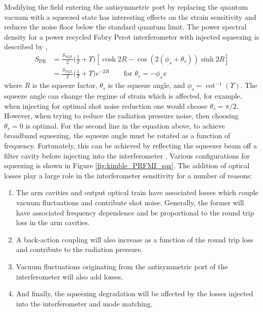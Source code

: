 	Modifying the field entering the antisymmetric port by replacing the quantum vacuum with a squeezed state has interesting effects on the strain sensitivity and reduces the noise floor below the standard quantum limit. The power spectral density for a power recycled Fabry Perot interferometer with injected squeezing is described by \cite{KimbleConversion},
	\begin{equation}
	\begin{aligned}
	S_{\text{PR}} 	&=  \frac{S_{SQL}}{2} \bigg( \frac{1}{\Upsilon}  + \Upsilon\bigg) [\cosh{2R} - \cos(2(\phi_s+\theta_s)) \sinh{2R}]\\
	&= \frac{S_{SQL}}{2} \bigg( \frac{1}{\Upsilon}  + \Upsilon\bigg) e^{-2R} \qquad \text{for } \theta_s = -\phi_s
x	\end{aligned}
	\end{equation}
	where $R$ is the squeeze factor, $\theta_s$ is the squeeze angle, and $\phi_s = \cot^{-1}(\Upsilon)$.  The squeeze angle can change the regime of strain which is affected, for example, when injecting for optimal shot noise reduction one would choose $\theta_s=\pi/2$.  However, when trying to reduce the radiation pressure noise, then choosing $\theta_s=0$ is optimal.   For the second line in the equation above, to achieve broadband squeezing, the squeeze angle must be rotated as a function of frequency.  Fortunately, this can be achieved by reflecting the squeezer beam off a filter cavity before injecting into the interferometer \cite{Oelker_FD_sqz} \cite{EvansRealistic}.  Various configurations for squeezing is shown in Figure \ref{fig:kimble_PRFMI_sqz}.  The addition of optical losses play a large role in the interferometer sensitivity for a number of reasons:
	\begin{enumerate}
		\item The arm cavities and output optical train have associated losses which couple vacuum fluctuations and contribute shot noise.  Generally, the former will have associated frequency dependence and be proportional to the round trip loss in the arm cavities.
		\item A back-action coupling will also increase as a function of the round trip loss and contribute to the radiation pressure.
		\item Vacuum fluctuations originating from the antisymmetric port of the interferometer will also add losses.
		\item And finally, the squeezing degradation will be affected by the losses injected into the interferometer and mode matching.
	\end{enumerate}

